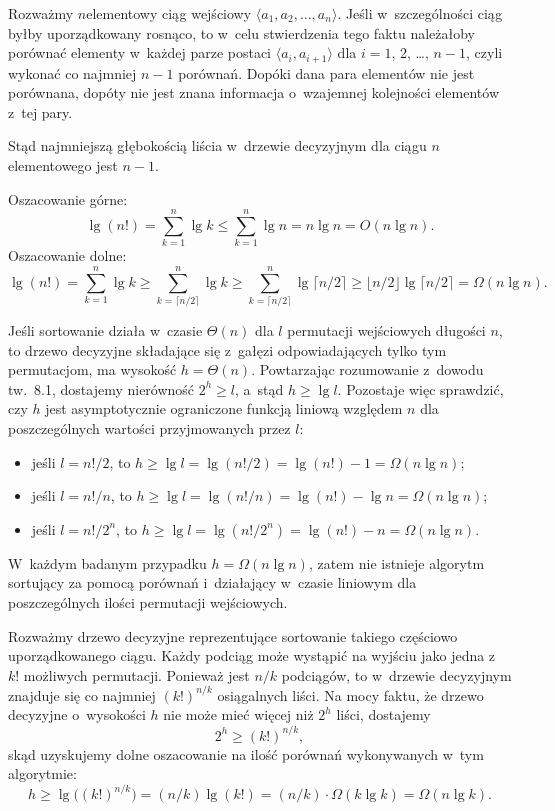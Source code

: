 
\exercise %
Rozważmy $n$\nbhyphen elementowy ciąg wejściowy $\langle a_1,a_2,\dots,a_n\rangle$.
Jeśli w~szczególności ciąg byłby uporządkowany rosnąco, to w~celu stwierdzenia tego faktu należałoby porównać elementy w~każdej parze postaci $\langle a_i,a_{i+1}\rangle$ dla $i=1$, 2, \dots, $n-1$, czyli wykonać co najmniej $n-1$ porównań.
Dopóki dana para elementów nie jest porównana, dopóty nie jest znana informacja o~wzajemnej kolejności elementów z~tej pary.

Stąd najmniejszą głębokością liścia w~drzewie decyzyjnym dla ciągu $n$\nbhyphen elementowego jest $n-1$.

\exercise %
Oszacowanie górne:
\[
	\lg(n!) = \sum_{k=1}^n\lg k \le \sum_{k=1}^n\lg n = n\lg n = O(n\lg n).
\]
Oszacowanie dolne:
\[
	\lg(n!) = \sum_{k=1}^n\lg k \ge \sum_{k=\lceil n/2\rceil}^n\lg k \ge \sum_{k=\lceil n/2\rceil}^n\lg\lceil n/2\rceil \ge \lfloor n/2\rfloor\lg\lceil n/2\rceil = \Omega(n\lg n).
\]

\exercise %
Jeśli sortowanie działa w~czasie $\Theta(n)$ dla $l$ permutacji wejściowych długości $n$, to drzewo decyzyjne składające się z~gałęzi odpowiadających tylko tym permutacjom, ma wysokość $h=\Theta(n)$.
Powtarzając rozumowanie z~dowodu tw.\ 8.1, dostajemy nierówność $2^h\ge l$, a~stąd $h\ge\lg l$.
Pozostaje więc sprawdzić, czy $h$ jest asymptotycznie ograniczone funkcją liniową względem $n$ dla poszczególnych wartości przyjmowanych przez $l$:
\begin{itemize}
	\item jeśli $l=n!/2$, to $h\ge\lg l=\lg(n!/2)=\lg(n!)-1=\Omega(n\lg n)$;
	\item jeśli $l=n!/n$, to $h\ge\lg l=\lg(n!/n)=\lg(n!)-\lg n=\Omega(n\lg n)$;
	\item jeśli $l=n!/2^n$, to $h\ge\lg l=\lg(n!/2^n)=\lg(n!)-n=\Omega(n\lg n)$.
\end{itemize}
W~każdym badanym przypadku $h=\Omega(n\lg n)$, zatem nie istnieje algorytm sortujący za pomocą porównań i~działający w~czasie liniowym dla poszczególnych ilości permutacji wejściowych.

\exercise %
Rozważmy drzewo decyzyjne reprezentujące sortowanie takiego częściowo uporządkowanego ciągu.
Każdy podciąg może wystąpić na wyjściu jako jedna z~$k!$ możliwych permutacji.
Ponieważ jest $n/k$ podciągów, to w~drzewie decyzyjnym znajduje się co najmniej $(k!)^{n/k}$ osiągalnych liści.
Na mocy faktu, że drzewo decyzyjne o~wysokości $h$ nie może mieć więcej niż $2^h$ liści, dostajemy
\[
	2^h \ge (k!)^{n/k},
\]
skąd uzyskujemy dolne oszacowanie na ilość porównań wykonywanych w~tym algorytmie:
\[
	h \ge \lg\bigl((k!)^{n/k}\bigr) = (n/k)\lg(k!) = (n/k)\cdot\Omega(k\lg k) = \Omega(n\lg k).
\]
